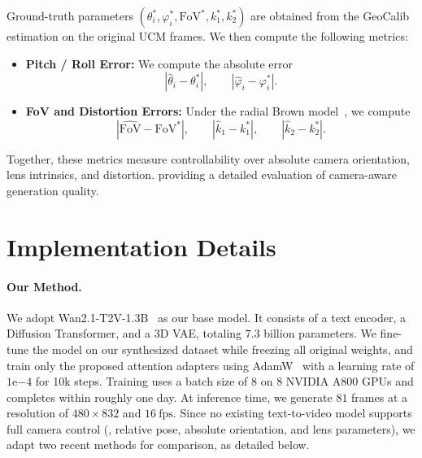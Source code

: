 Ground-truth parameters \(({\theta}_i^{\ast}, {\varphi}_i^{\ast}, \mathrm{FoV}^{\ast}, k_1^{\ast}, k_2^{\ast})\) are obtained from the GeoCalib estimation on the original UCM frames.
We then compute the following metrics:

\begin{itemize}

    \item \textbf{Pitch / Roll Error:}  
    We compute the absolute error
    \begin{equation}
    |\hat{\theta}_i - \theta_i^{\ast}|,
    \qquad
    |\hat{\varphi}_i - \varphi_i^{\ast}|.
    \end{equation}

    \item \textbf{FoV and Distortion Errors:}
    Under the radial Brown model~\cite{Brown1966DecenteringDO}, we compute
    \begin{equation}
    |\hat{\mathrm{FoV}} - \mathrm{FoV}^\ast|,
    \qquad
    |\hat{k}_1 - k_1^\ast|,
    \qquad
    |\hat{k}_2 - k_2^\ast|.
    \end{equation}

\end{itemize}

Together, these metrics measure controllability over absolute camera orientation, lens intrinsics, and distortion.
providing a detailed evaluation of camera-aware generation quality.




\section{Implementation Details}
\label{sec:impl}



\paragraph{Our Method.}
We adopt Wan2.1-T2V-1.3B~\cite{wan2025wan} as our base model.
It consists of a text encoder, a Diffusion Transformer, and a 3D VAE, totaling \(7.3\) billion parameters.
We fine-tune the model on our synthesized dataset while freezing all original weights, and train only the proposed attention adapters using AdamW~\cite{loshchilovdecoupled} with a learning rate of \(1\mathrm{e}{-4}\) for 10k steps.
Training uses a batch size of 8 on 8 NVIDIA A800 GPUs and completes within roughly one day.
At inference time, we generate \(81\) frames at a resolution of \(480 \times 832\) and \(16~\mathrm{fps}\).
Since no existing text-to-video model supports full camera control (\ie, relative pose, absolute orientation, and lens parameters), we adapt two recent methods for comparison, as detailed below.

